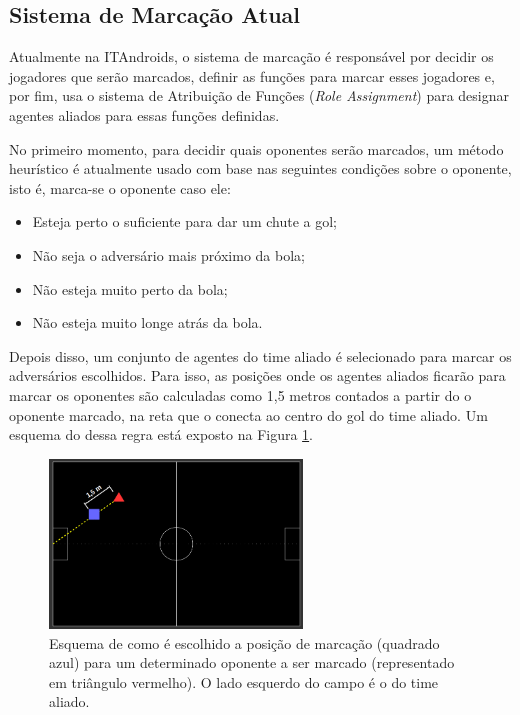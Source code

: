 \documentclass[a4paper,12pt]{article}
\begin{document}
\subsection{Sistema de Marcação Atual}

Atualmente na ITAndroids, o sistema de marcação é responsável por decidir os jogadores que serão marcados, definir as funções para marcar esses jogadores e, por fim, usa o sistema de Atribuição de Funções (\textit{Role Assignment}) para designar agentes aliados para essas funções definidas.

No primeiro momento, para decidir quais oponentes serão marcados, um método heurístico é atualmente usado com base nas seguintes condições sobre o oponente, isto é, marca-se o oponente caso ele:

\begin{itemize}
\item Esteja perto o suficiente para dar um chute a gol;
\item Não seja o adversário mais próximo da bola;
\item Não esteja muito perto da bola;
\item Não esteja muito longe atrás da bola.
\end{itemize}

Depois disso, um conjunto de agentes do time aliado é selecionado para marcar os adversários escolhidos. Para isso, as posições onde os agentes aliados ficarão para marcar os oponentes são calculadas como 1,5 metros contados a partir do o oponente marcado, na reta que o conecta ao centro do gol do time aliado. Um esquema do dessa regra está exposto na Figura \ref{fig:marking-position}.

\begin{figure}[H]
	\centering
	\includegraphics[width=0.6\textwidth]{figures/marking-position.png}
   \caption{Esquema de como é escolhido a posição de marcação (quadrado azul) para um determinado oponente a ser marcado (representado em triângulo vermelho). O lado esquerdo do campo é o do time aliado.} \label{fig:marking-position}
\end{figure}
\end{document}
